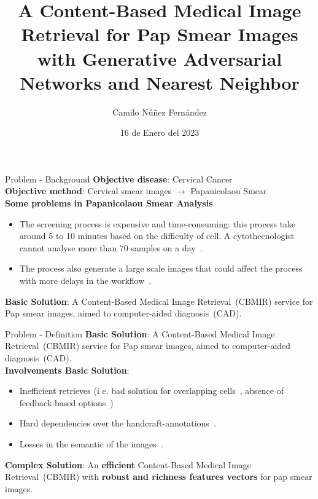 \documentclass[xcolor=dvipsnames]{beamer}
\title[CBMIR for Pap Smear Images]{A Content-Based Medical Image Retrieval for Pap Smear Images with Generative Adversarial Networks and Nearest Neighbor}
\date{16 de Enero del 2023}
\author[CNF]{Camilo Núñez Fernández}
\institute[]{Departamento de Informática}
\begin{document}
	\begingroup 
        \begin{frame}
            \titlepage
        \end{frame}
    \endgroup

    \begin{frame}{Problem - Background}
        \textbf{Objective disease}: Cervical Cancer \\\vspace{5mm}
        \textbf{Objective method}: Cervical smear images $\longrightarrow$ Papanicolaou Smear\\\vspace{5mm}
        \textbf{Some problems in Papanicolaou Smear Analysis}\\
        \begin{itemize}
            \item The screening process is expensive and time-consuming: this process take around 5 to 10 minutes based on the difficulty of cell. A cytothecnologist cannot analyse more than 70 samples on a day~\cite{Elsheikh2012}.
            \item The process also generate a large scale images that could affect the process with more delays in the workflow~\cite{9046839}.
        \end{itemize}\vspace{5mm}
        \textbf{Basic Solution}: A Content-Based Medical Image Retrieval~(CBMIR) service for Pap smear images, aimed to computer-aided diagnosis~(CAD).
    \end{frame}

    \begin{frame}{Problem - Definition}
        \textbf{Basic Solution}: A Content-Based Medical Image Retrieval~(CBMIR) service for Pap smear images, aimed to computer-aided diagnosis~(CAD).\\
        \vspace{5mm}
        \textbf{Involvements Basic Solution}:
        \begin{itemize}
            \item Inefficient retrieves (i e. bad solution for overlapping cells~\cite{Zhao2022}, absence of feedback-based options~\cite{9606873})
            \item Hard dependencies over the handcraft-annotations~\cite{Mller2004}.
            \item Losses in the semantic of the images~\cite{9046839}.
        \end{itemize}
        \vspace{5mm}
        \textbf{Complex Solution}: An \textbf{efficient} Content-Based Medical Image Retrieval~(CBMIR) with \textbf{robust and richness features vectors} for pap smear images.
    \end{frame}
\end{document}
